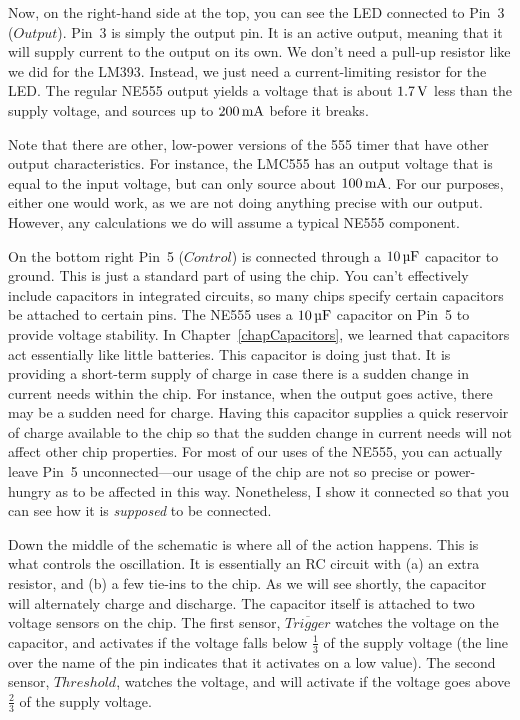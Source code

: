 Now, on the right-hand side at the top, you can see the LED connected to Pin~3 ($Output$).
Pin~3 is simply the output pin.
It is an active output, meaning that it will supply current to the output on its own.  
We don't need a pull-up resistor like we did for the LM393.
Instead, we just need a current-limiting resistor for the LED.
The regular NE555 output yields a voltage that is about $1.7\,\si{\volt}$ less than the supply voltage, and sources up to $200\,\si{\milli\ampere}$ before it breaks.

Note that there are other, low-power versions of the 555 timer that have other output characteristics.
For instance, the LMC555 has an output voltage that is equal to the input voltage, but can only source about $100\,\si{\milli\ampere}$.
For our purposes, either one would work, as we are not doing anything precise with our output.
However, any calculations we do will assume a typical NE555 component.

On the bottom right Pin~5 ($Control$) is connected through a $10\,\si{\micro\farad}$ capacitor to ground.
This is just a standard part of using the chip. 
You can't effectively include capacitors in integrated circuits, so many chips specify certain capacitors be attached to certain pins.
The NE555 uses a $10\,\si{\micro\farad}$ capacitor on Pin~5 to provide voltage stability.
In Chapter~\ref{chapCapacitors}, we learned that capacitors act essentially like little batteries.
This capacitor is doing just that.
It is providing a short-term supply of charge in case there is a sudden change in current needs within the chip.
For instance, when the output goes active, there may be a sudden need for charge.
Having this capacitor supplies a quick reservoir of charge available to the chip so that the sudden change in current needs will not affect other chip properties.
For most of our uses of the NE555, you can actually leave Pin~5 unconnected---our usage of the chip are not so precise or power-hungry as to be affected in this way.  
Nonetheless, I show it connected so that you can see how it is \emph{supposed} to be connected.

Down the middle of the schematic is where all of the action happens.
This is what controls the oscillation.
It is essentially an RC circuit with (a) an extra resistor, and (b) a few tie-ins to the chip.
As we will see shortly, the capacitor will alternately charge and discharge.
The capacitor itself is attached to two voltage sensors on the chip.
The first sensor, $\overline{Trigger}$ watches the voltage on the capacitor, and activates if the voltage falls below $\frac{1}{3}$ of the supply voltage (the line over the name of the pin indicates that it activates on a low value).
The second sensor, $Threshold$, watches the voltage, and will activate if the voltage goes above $\frac{2}{3}$ of the supply voltage.

